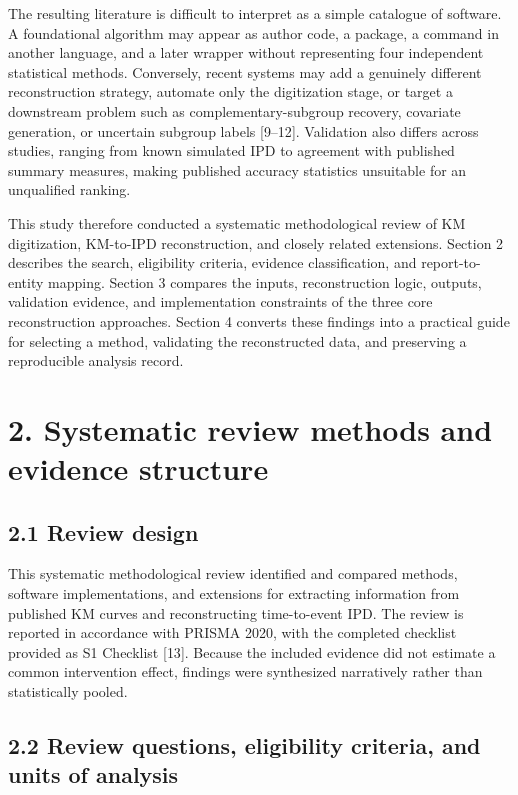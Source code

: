 \documentclass[
  english,
  letterpaper,
  DIV=11,
  numbers=noendperiod]{scrartcl}
\begin{document}
The resulting literature is difficult to interpret as a simple catalogue
of software. A foundational algorithm may appear as author code, a
package, a command in another language, and a later wrapper without
representing four independent statistical methods. Conversely, recent
systems may add a genuinely different reconstruction strategy, automate
only the digitization stage, or target a downstream problem such as
complementary-subgroup recovery, covariate generation, or uncertain
subgroup labels {[}9--12{]}. Validation also differs across studies,
ranging from known simulated IPD to agreement with published summary
measures, making published accuracy statistics unsuitable for an
unqualified ranking.

This study therefore conducted a systematic methodological review of KM
digitization, KM-to-IPD reconstruction, and closely related extensions.
Section 2 describes the search, eligibility criteria, evidence
classification, and report-to-entity mapping. Section 3 compares the
inputs, reconstruction logic, outputs, validation evidence, and
implementation constraints of the three core reconstruction approaches.
Section 4 converts these findings into a practical guide for selecting a
method, validating the reconstructed data, and preserving a reproducible
analysis record.

\section{2. Systematic review methods and evidence
structure}\label{systematic-review-methods-and-evidence-structure}

\subsection{2.1 Review design}\label{review-design}

This systematic methodological review identified and compared methods,
software implementations, and extensions for extracting information from
published KM curves and reconstructing time-to-event IPD. The review is
reported in accordance with PRISMA 2020, with the completed checklist
provided as S1 Checklist {[}13{]}. Because the included evidence did not
estimate a common intervention effect, findings were synthesized
narratively rather than statistically pooled.

\subsection{2.2 Review questions, eligibility criteria, and units of
analysis}\label{review-questions-eligibility-criteria-and-units-of-analysis}
\end{document}

